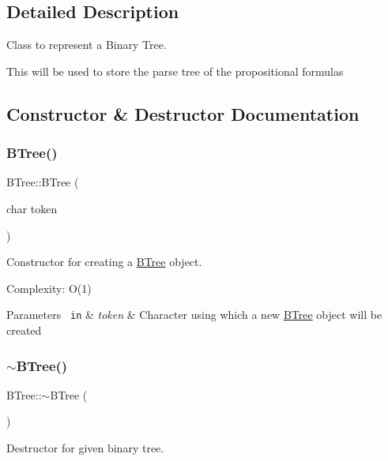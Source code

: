 \subsection{Detailed Description}
Class to represent a Binary Tree. 

This will be used to store the parse tree of the propositional formulas 

\subsection{Constructor \& Destructor Documentation}
\mbox{\label{classBTree_a816ccfed62d3bd439b61c03f660d1cc6}} 
\subsubsection{\texorpdfstring{B\+Tree()}{BTree()}}
{\footnotesize\ttfamily B\+Tree\+::\+B\+Tree (\begin{DoxyParamCaption}\item[{char}]{token }\end{DoxyParamCaption})\hspace{0.3cm}{\ttfamily [explicit]}}



Constructor for creating a \mbox{\hyperlink{classBTree}{B\+Tree}} object. 

Complexity\+: O(1) 
\begin{DoxyParams}[1]{Parameters}
\mbox{\texttt{ in}}  & {\em token} & Character using which a new \mbox{\hyperlink{classBTree}{B\+Tree}} object will be created \\
\hline
\end{DoxyParams}
\mbox{\label{classBTree_a1d0dbad21ec825a7c8e5625709010e6c}} 
\subsubsection{\texorpdfstring{$\sim$\+B\+Tree()}{~BTree()}}
{\footnotesize\ttfamily B\+Tree\+::$\sim$\+B\+Tree (\begin{DoxyParamCaption}{ }\end{DoxyParamCaption})}



Destructor for given binary tree. 

